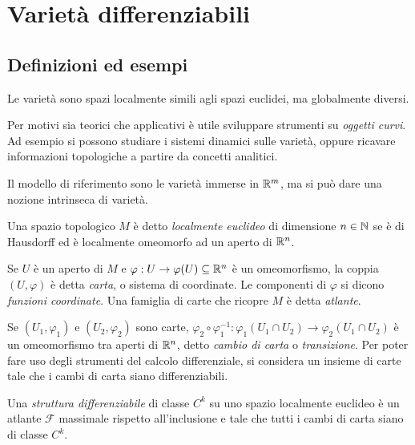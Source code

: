 \chapter{Varietà differenziabili}

\section{Definizioni ed esempi}
 
 Le varietà sono spazi localmente simili agli spazi euclidei, ma globalmente diversi.
 
 Per motivi sia teorici che applicativi è utile sviluppare strumenti su \emph{oggetti curvi}.
 Ad esempio si possono studiare i sistemi dinamici sulle varietà, oppure ricavare
 informazioni topologiche a partire da concetti analitici.
 
 Il modello di riferimento sono le varietà immerse in $\mathbb R^m$, ma si può dare
 una nozione intrinseca di varietà.
 
 \begin{definition} 
 Una spazio topologico $M$ è detto \emph{localmente euclideo} di dimensione $n\in\mathbb N$ se è di Hausdorff ed è localmente omeomorfo ad un aperto di $\mathbb R^n$.
 \end{definition}
 
 \begin{definition}   
 Se $U$ è un aperto di $M$ e $\varphi:U\to \varphi(U)\subseteq \mathbb R^n$
 è un omeomorfismo, la coppia $(U, \varphi)$ è detta \emph{carta}, o sistema di coordinate.
 Le componenti di $\varphi$ si dicono \emph{funzioni coordinate}. Una famiglia di carte
 che ricopre $M$ è detta \emph{atlante}.
 \end{definition}
 
 Se $(U_1, \varphi_1)$ e $(U_2, \varphi_2)$ sono carte, $\varphi_2\circ\varphi_1^{-1}:\varphi_1(U_1\cap U_2)\to\varphi_2(U_1\cap U_2)$
 è un omeomorfismo tra aperti di $\mathbb R^n$, detto \emph{cambio di carta} o \emph{transizione}.
 Per poter fare uso degli strumenti del calcolo differenziale, si considera un insieme
 di carte tale che i cambi di carta siano differenziabili.
 
 \begin{definition} 
 Una \emph{struttura differenziabile} di classe $C^k$ su uno
 spazio localmente euclideo è un atlante $\mathcal F$ massimale rispetto all'inclusione e tale che tutti i cambi di carta siano
 di classe $C^k$.
 \end{definition}
 

